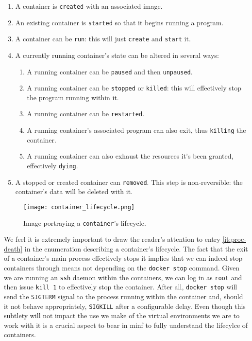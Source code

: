                 \begin{enumerate}
                    \item A container is \texttt{created} with an associated image.
                    \item An existing container is \texttt{started} so that it begins running a program.
                    \item A container can be \texttt{run}: this will just \texttt{create} and \texttt{start} it.
                    \item A currently running container's state can be altered in several ways:
                    \begin{enumerate}
                        \item A running container can be \texttt{paused} and then \texttt{unpaused}.
                        \item A running container can be \texttt{stopped} or \texttt{killed}: this will effectively stop the program running within it.
                        \item A running container can be \texttt{restarted}.
                        \item A running container's associated program can also exit, thus \texttt{killing} the container. \label{it:proc-death}
                        \item A running container can also exhaust the resources it's been granted, effectively \texttt{dying}.
                    \end{enumerate}
                    \item A stopped or created container can \texttt{removed}. This step is non-reversible: the container's data will be deleted with it.
                \end{enumerate}

                \begin{figure}
                    \centering
                    \texttt{[image: container\_lifecycle.png]}
                    \caption[Container Lifecycle]{Image portraying a \texttt{container}'s lifecycle. \cite{bib:container-lifecycle}}
                    \label{fig:container-lifecycle}
                \end{figure}

                We feel it is extremely important to draw the reader's attention to entry \ref{it:proc-death} in the enumeration describing a container's lifecycle. The fact that the exit of a container's main process effectively stops it implies that we can indeed stop containers through means not depending on the \texttt{docker stop} command. Given we are running an \texttt{ssh} daemon within the containers, we can log in as \texttt{root} and then issue \texttt{kill 1} to effectively stop the container. After all, \texttt{docker stop} will send the \texttt{SIGTERM} signal to the process running within the container and, should it not behave appropriately, \texttt{SIGKILL} after a configurable delay. Even though this subtlety will not impact the use we make of the virtual environments we are to work with it is a crucial aspect to bear in minf to fully understand the lifecylce of containers.\\

